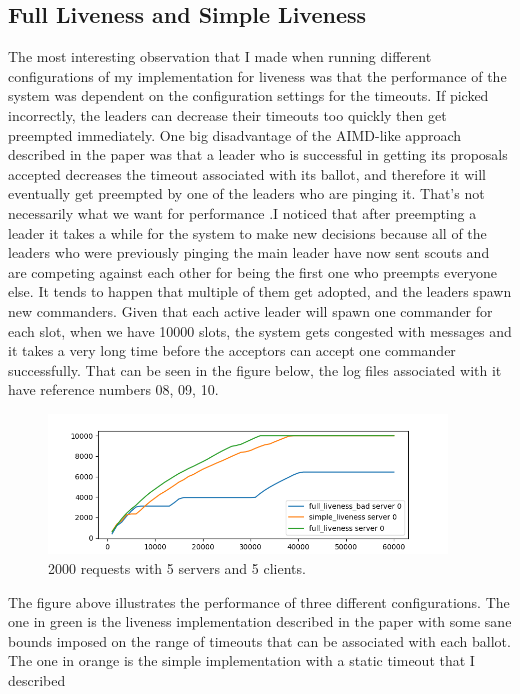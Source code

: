 \documentclass[11pt]{article}
\begin{document}
\subsection*{Full Liveness and Simple Liveness}
The most interesting observation that I made when running different configurations
of my implementation for liveness was that the performance of the system was
dependent on the configuration settings for the timeouts. If picked incorrectly,
the leaders can decrease their timeouts too quickly then get preempted immediately.
One big disadvantage of the AIMD-like approach described in the paper was that
a leader who is successful in getting its proposals accepted decreases the timeout
associated with its ballot, and therefore it will eventually get preempted by one
of the leaders who are pinging it. That's not necessarily what we want for performance
.I noticed that after preempting a leader it takes a while for the system to make
new decisions because all of the leaders who were previously pinging the main leader have now
sent scouts and are competing against each other for being the first one who preempts
everyone else. It tends to happen that multiple of them get adopted, and the leaders spawn
new commanders. Given that each active leader will spawn one commander for each slot,
when we have 10000 slots, the system gets congested with messages and it takes
a very long time before the acceptors can accept one commander successfully.
That can be seen in the figure below, the log files associated with it have
reference numbers 08, 09, 10.
\begin{figure}[H]
    \centering
    \includegraphics[width=400px]{liveness_simple_bad_config.png}
    \caption{2000 requests with 5 servers and 5 clients.}
    \vspace{-15pt}
\end{figure}
The figure above illustrates the performance of three different configurations.
The one in green is the liveness implementation described in the paper with some
sane bounds imposed on the range of timeouts that can be associated with each ballot.
The one in orange is the simple implementation with a static timeout that I described
\end{document}
